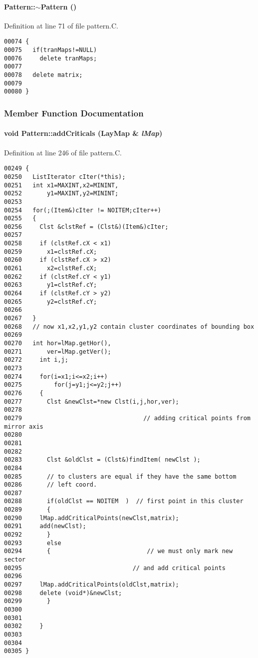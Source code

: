 \paragraph{\setlength{\rightskip}{0pt plus 5cm}Pattern::$\sim$Pattern ()}\hfill



Definition at line 71 of file pattern.C.\small\begin{verbatim}00074 {
00075   if(tranMaps!=NULL)
00076     delete tranMaps;
00077 
00078   delete matrix;
00079 
00080 }
\end{verbatim}\normalsize 


\subsubsection{Member Function Documentation}
\label{Pattern_a6}
\paragraph{\setlength{\rightskip}{0pt plus 5cm}void Pattern::add\-Criticals ({\bf Lay\-Map} \& {\em l\-Map})}\hfill



Definition at line 246 of file pattern.C.\small\begin{verbatim}00249 {
00250   ListIterator cIter(*this);
00251   int x1=MAXINT,x2=MININT,
00252       y1=MAXINT,y2=MININT;
00253 
00254   for(;(Item&)cIter != NOITEM;cIter++)
00255   {
00256     Clst &clstRef = (Clst&)(Item&)cIter;
00257     
00258     if (clstRef.cX < x1) 
00259       x1=clstRef.cX;
00260     if (clstRef.cX > x2)
00261       x2=clstRef.cX;
00262     if (clstRef.cY < y1) 
00263       y1=clstRef.cY;
00264     if (clstRef.cY > y2)
00265       y2=clstRef.cY;
00266 
00267   }
00268   // now x1,x2,y1,y2 contain cluster coordinates of bounding box
00269 
00270   int hor=lMap.getHor(),
00271       ver=lMap.getVer();
00272     int i,j;
00273 
00274     for(i=x1;i<=x2;i++)
00275         for(j=y1;j<=y2;j++)
00276     {
00277       Clst &newClst=*new Clst(i,j,hor,ver);
00278                                 
00279                                  // adding critical points from mirror axis
00280 
00281 
00282       
00283       Clst &oldClst = (Clst&)findItem( newClst );
00284       
00285       // to clusters are equal if they have the same bottom
00286       // left coord.
00287       
00288       if(oldClst == NOITEM  )  // first point in this cluster
00289       {
00290     lMap.addCriticalPoints(newClst,matrix);
00291     add(newClst);
00292       }
00293       else
00294       {                           // we must only mark new sector
00295                               // and add critical points
00296 
00297     lMap.addCriticalPoints(oldClst,matrix);
00298     delete (void*)&newClst;
00299       }  
00300       
00301 
00302     }
00303 
00304 
00305 }
\end{verbatim}\normalsize 
\label{Pattern_a12}

